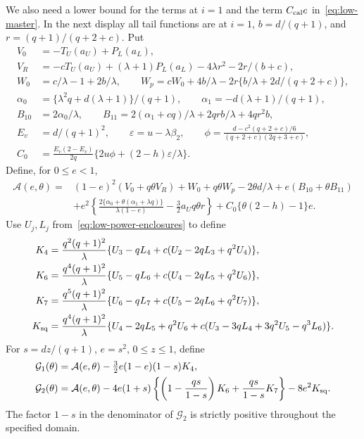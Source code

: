 We also need a lower bound for the terms at $i=1$ and the term
$C_{\rm cal}e$ in~\eqref{eq:low-master}. In the next display all tail
functions are at $i=1$, $b=d/(q+1)$, and
$r=(q+1)/(q+2+c)$.  Put
\begin{align*}
 V_0&=-T_U(a_U)+P_L(a_L),\\
 V_R&=-cT_U(a_U)+(\lambda+1)P_L(a_L)-4\lambda r^2-2r/(b+c),\\
 W_0&=c/\lambda-1+2b/\lambda,\qquad
 W_p=cW_0+4b/\lambda
          -2r\{b/\lambda+2d/(q+2+c)\},\\
 \alpha_0&=\{\lambda^2q+d(\lambda+1)\}/(q+1),\qquad
 \alpha_1=-d(\lambda+1)/(q+1),\\
 B_{10}&=2\alpha_0/\lambda,\qquad
 B_{11}=2(\alpha_1+cq)/\lambda+2qrb/\lambda+4qr^2b,\\
 E_v&=d/(q+1)^2,\qquad
 \varepsilon=u-\lambda\beta_2,\qquad
 \phi=\frac{d-c^2(q+2+c)/6}{(q+2+c)(2q+3+c)},\\
 C_0&=\frac{E_v(2-E_v)}{2q}
                 \{2u\phi+(2-h)\varepsilon/\lambda\}.
\end{align*}
Define, for $0\le e<1$,
\begin{align}
 \mathcal A(e,\theta)={}&(1-e)^2(V_0+q\theta V_R)
 +W_0+q\theta W_p-2\theta d/\lambda+e(B_{10}+\theta B_{11})
 \nonumber\\
 &+e^2\left\{\frac{2\{\alpha_0+\theta(\alpha_1+\lambda q)\}}
                     {\lambda(1-e)}
                         -\frac32a_Uq\theta r\right\}
       +C_0\{\theta(2-h)-1\}e.\label{eq:low-root-rational}
\end{align}
Use $U_j,L_j$ from~\eqref{eq:low-power-enclosures} to define
\begin{align}
 K_4={}&\frac{q^2(q+1)^2}\lambda
       \{U_3-qL_4+c(U_2-2qL_3+q^2U_4)\},\nonumber\\
 K_6={}&\frac{q^4(q+1)^2}\lambda
       \{U_5-qL_6+c(U_4-2qL_5+q^2U_6)\},\nonumber\\
 K_7={}&\frac{q^5(q+1)^2}\lambda
       \{U_6-qL_7+c(U_5-2qL_6+q^2U_7)\},\nonumber\\
 K_{\rm sq}={}&\frac{q^4(q+1)^2}\lambda
       \{U_4-2qL_5+q^2U_6+c(U_3-3qL_4+3q^2U_5-q^3L_6)\}.
 \label{eq:low-rational-costs}
\end{align}
For $s=dz/(q+1)$, $e=s^2$, $0\le z\le1$, define
\begin{align}
 \mathcal G_1(\theta)&=\mathcal A(e,\theta)
                     -\tfrac32e(1-e)(1-s)K_4,\nonumber\\
 \mathcal G_2(\theta)&=\mathcal A(e,\theta)
       -4e(1+s)\left\{\left(1-\frac{qs}{1-s}\right)K_6
                            +\frac{qs}{1-s}K_7\right\}
       -8e^2K_{\rm sq}.\label{eq:low-finite-budgets}
\end{align}
The factor $1-s$ in the denominator of $\mathcal G_2$ is strictly
positive throughout the specified domain.

